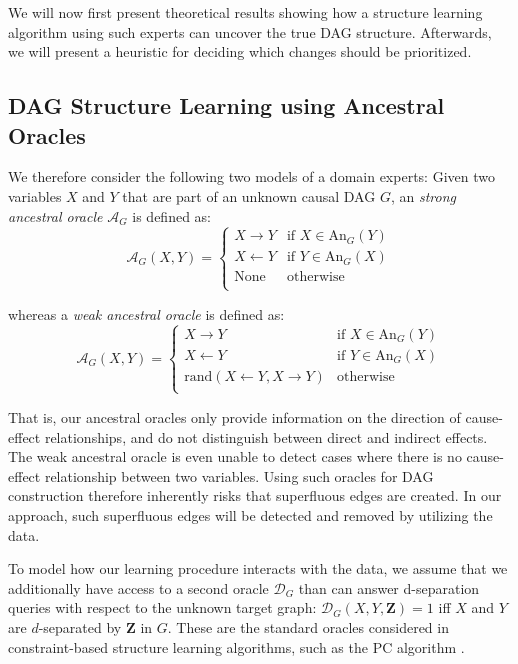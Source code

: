 \documentclass{uai2025} %
\begin{document}
We will now first present theoretical results showing how a structure
learning algorithm using such experts can uncover the true DAG structure.
Afterwards, we will present a heuristic for deciding which changes should
be prioritized.

\subsection{DAG Structure Learning using Ancestral Oracles}

\label{sec:modification}

We therefore consider the following two models of a domain experts: Given two variables
$ X $ and $ Y $ that are part of an unknown causal DAG $G$, an \emph{strong ancestral oracle} 
$\mathcal{A}_G$ is defined as:
$$\mathcal{A}_G(X,Y)=\begin{cases}
 X \to Y & \textrm{if } X \in \textrm{An}_G(Y) \\
 X \gets Y & \textrm{if } Y \in \textrm{An}_G(X) \\
 \textrm{None} & \textrm{otherwise} \\
\end{cases}$$

whereas a \emph{weak ancestral oracle} is defined as:
$$
\mathcal{A}_G(X,Y)=\begin{cases}
 X \to Y & \textrm{if } X \in \textrm{An}_G(Y) \\
 X \gets Y & \textrm{if } Y \in \textrm{An}_G(X) \\
 \textrm{rand}(X \gets Y, X \to Y) & \textrm{otherwise} \\
\end{cases}
$$

That is, our ancestral oracles only provide information on the direction of cause-effect
relationships, and do not distinguish between direct and indirect effects. 
The weak ancestral oracle is even unable to detect cases where there is no cause-effect
relationship between two variables. Using such oracles for DAG construction therefore 
inherently risks that superfluous edges are created. In our approach, such superfluous edges
will be detected and removed by utilizing the data. 

To model how our learning procedure interacts with the data, we assume that we
additionally have access to a second oracle $\mathcal{D}_G$ than can answer d-separation
queries with respect to the unknown target graph:
$\mathcal{D}_G(X,Y,\mathbf{Z})=1$ iff $X$ and $Y$ are $d$-separated by $\mathbf{Z}$ in 
$G$. These are the standard oracles considered in constraint-based structure learning
algorithms, such as the PC algorithm \cite{Spirtes2001}. 
\end{document}

